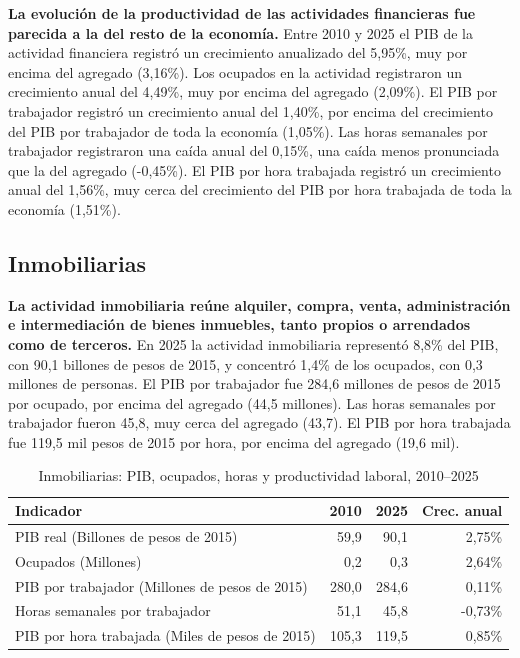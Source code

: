 \textbf{La evolución de la productividad de las actividades financieras fue parecida a la del resto de la economía.} Entre 2010 y 2025 el PIB de la actividad financiera registró un crecimiento anualizado del 5,95\%, muy por encima del agregado (3,16\%). Los ocupados en la actividad registraron un crecimiento anual del 4,49\%, muy por encima del agregado (2,09\%). El PIB por trabajador registró un crecimiento anual del 1,40\%, por encima del crecimiento del PIB por trabajador de toda la economía (1,05\%). Las horas semanales por trabajador registraron una caída anual del 0,15\%, una caída menos pronunciada que la del agregado (-0,45\%). El PIB por hora trabajada registró un crecimiento anual del 1,56\%, muy cerca del crecimiento del PIB por hora trabajada de toda la economía (1,51\%).

\subsection{Inmobiliarias}

\textbf{La actividad inmobiliaria reúne alquiler, compra, venta, administración e intermediación de bienes inmuebles, tanto propios o arrendados como de terceros.} En 2025 la actividad inmobiliaria representó 8,8\% del PIB, con 90,1 billones de pesos de 2015, y concentró 1,4\% de los ocupados, con 0,3 millones de personas. El PIB por trabajador fue 284,6 millones de pesos de 2015 por ocupado, por encima del agregado (44,5 millones). Las horas semanales por trabajador fueron 45,8, muy cerca del agregado (43,7). El PIB por hora trabajada fue 119,5 mil pesos de 2015 por hora, por encima del agregado (19,6 mil).

\begin{table}[H]
\centering
\caption{Inmobiliarias: PIB, ocupados, horas y productividad laboral, 2010--2025}
\label{tab:sector_l_productividad}
\small
\begin{tabular}{lrrr}
\toprule
Indicador & 2010 & 2025 & Crec. anual \\
\midrule
PIB real  (Billones de pesos de 2015) & 59,9 & 90,1 & 2,75\% \\
Ocupados (Millones) & 0,2 & 0,3 & 2,64\% \\
PIB por trabajador (Millones de pesos de 2015) & 280,0 & 284,6 & 0,11\% \\
Horas semanales por trabajador & 51,1 & 45,8 & -0,73\% \\
PIB por hora trabajada (Miles de pesos de 2015) & 105,3 & 119,5 & 0,85\% \\
\bottomrule
\end{tabular}
\end{table}

